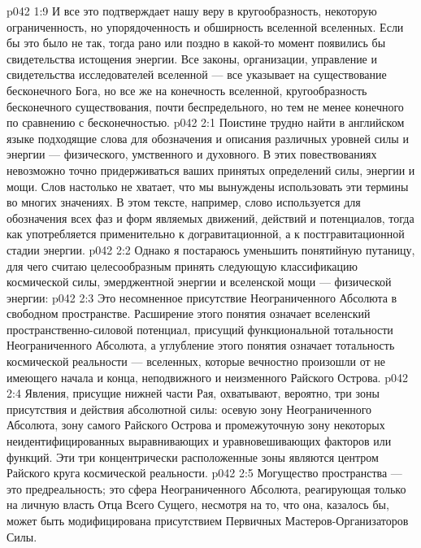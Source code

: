\vs p042 1:9 \pc И все это подтверждает нашу веру в кругообразность, некоторую ограниченность, но упорядоченность и обширность вселенной вселенных. Если бы это было не так, тогда рано или поздно в какой\hyp{}то момент появились бы свидетельства истощения энергии. Все законы, организации, управление и свидетельства исследователей вселенной --- все указывает на существование бесконечного Бога, но все же на конечность вселенной, кругообразность бесконечного существования, почти беспредельного, но тем не менее конечного по сравнению с бесконечностью.
\vs p042 2:1 Поистине трудно найти в английском языке подходящие слова для обозначения и описания различных уровней силы и энергии --- физического, умственного и духовного. В этих повествованиях невозможно точно придерживаться ваших принятых определений силы, энергии и мощи. Слов настолько не хватает, что мы вынуждены использовать эти термины во многих значениях. В этом тексте, например, слово  используется для обозначения всех фаз и форм являемых движений, действий и потенциалов, тогда как  употребляется применительно к догравитационной, а  к постгравитационной стадии энергии.
\vs p042 2:2 Однако я постараюсь уменьшить понятийную путаницу, для чего считаю целесообразным принять следующую классификацию космической силы, эмерджентной энергии и вселенской мощи --- физической энергии:
\vs p042 2:3 \bibnobreakspace {}  Это несомненное присутствие Неограниченного Абсолюта в свободном пространстве. Расширение этого понятия означает вселенский пространственно\hyp{}силовой потенциал, присущий функциональной тотальности Неограниченного Абсолюта, а углубление этого понятия означает тотальность космической реальности --- вселенных, которые вечностно произошли от не имеющего начала и конца, неподвижного и неизменного Райского Острова.
\vs p042 2:4 Явления, присущие нижней части Рая, охватывают, вероятно, три зоны присутствия и действия абсолютной силы: осевую зону Неограниченного Абсолюта, зону самого Райского Острова и промежуточную зону некоторых неидентифицированных выравнивающих и уравновешивающих факторов или функций. Эти три концентрически расположенные зоны являются центром Райского круга космической реальности.
\vs p042 2:5 Могущество пространства --- это предреальность; это сфера Неограниченного Абсолюта, реагирующая только на личную власть Отца Всего Сущего, несмотря на то, что она, казалось бы, может быть модифицирована присутствием Первичных Мастеров\hyp{}Организаторов Силы.

